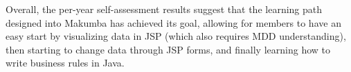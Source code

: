 \documentclass{chi2009}
\begin{document}
Overall, the per-year self-assessment results suggest that the learning path designed into Makumba has achieved its goal, allowing for members to have an easy start by visualizing data in JSP (which also requires MDD understanding), then starting to change data through JSP forms, and finally learning how to write business rules in Java.




%
\end{document}
